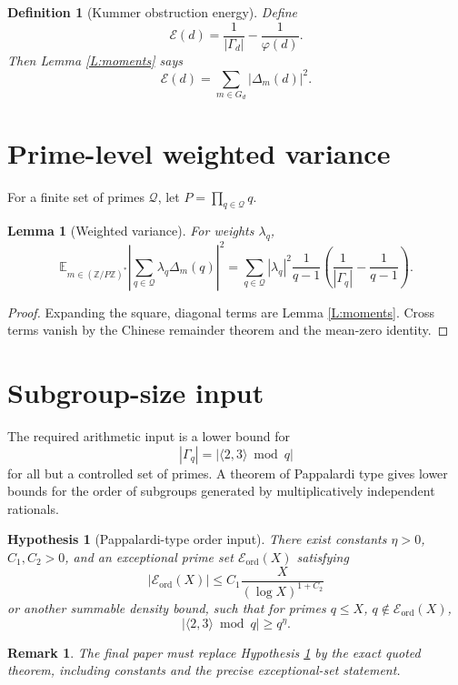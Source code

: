 \documentclass[11pt]{article}
\newtheorem{lemma}{Lemma}
\newtheorem{definition}{Definition}
\newtheorem{hypothesis}{Hypothesis}
\newtheorem{remark}{Remark}
\newcommand{\Z}{\mathbb Z}
\newcommand{\E}{\mathbb E}
\newcommand{\1}{\mathbf 1}
\begin{document}
\begin{definition}[Kummer obstruction energy]
Define
\[
\mathcal E(d)=\frac1{|\Gamma_d|}-\frac1{\varphi(d)}.
\]
Then Lemma \ref{L:moments} says
\[
\mathcal E(d)=\sum_{m\in G_d}|\Delta_m(d)|^2.
\]
\end{definition}

\section{Prime-level weighted variance}

For a finite set of primes \(\mathcal Q\), let \(P=\prod_{q\in\mathcal Q}q\).

\begin{lemma}[Weighted variance]\label{L:weighted}
For weights \(\lambda_q\),
\[
\E_{m\in(\Z/P\Z)^*}
\left|
\sum_{q\in\mathcal Q}\lambda_q\Delta_m(q)
\right|^2
=
\sum_{q\in\mathcal Q}
|\lambda_q|^2
\frac1{q-1}
\left(
\frac1{|\Gamma_q|}-\frac1{q-1}
\right).
\]
\end{lemma}

\begin{proof}
Expanding the square, diagonal terms are Lemma \ref{L:moments}.  Cross terms vanish by the Chinese remainder theorem and the mean-zero identity.
\end{proof}

\section{Subgroup-size input}

The required arithmetic input is a lower bound for
\[
|\Gamma_q|=|\langle2,3\rangle\bmod q|
\]
for all but a controlled set of primes.  A theorem of Pappalardi type gives lower bounds for the order of subgroups generated by multiplicatively independent rationals.

\begin{hypothesis}[Pappalardi-type order input]\label{H:papp}
There exist constants \(\eta>0\), \(C_1,C_2>0\), and an exceptional prime set \(\mathcal E_{\mathrm{ord}}(X)\) satisfying
\[
|\mathcal E_{\mathrm{ord}}(X)|\le C_1\frac{X}{(\log X)^{1+C_2}}
\]
or another summable density bound, such that for primes \(q\le X\), \(q\notin\mathcal E_{\mathrm{ord}}(X)\),
\[
|\langle2,3\rangle\bmod q|\ge q^\eta.
\]
\end{hypothesis}

\begin{remark}
The final paper must replace Hypothesis \ref{H:papp} by the exact quoted theorem, including constants and the precise exceptional-set statement.
\end{remark}
\end{document}
